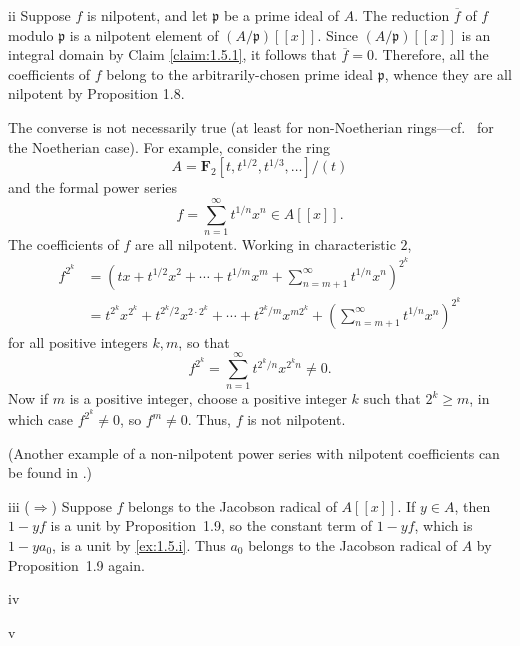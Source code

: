 \begin{partsolution}{1}{5}{ii}
Suppose \(f\) is nilpotent, and let \(\mathfrak p\) be a prime ideal of \(A\).
The reduction \(\overline f\) of \(f\) modulo \(\mathfrak p\) is a nilpotent element of \((A/\mathfrak p)[[x]]\).
Since \((A/\mathfrak p)[[x]]\) is an integral domain by Claim \ref{claim:1.5.1}, it follows that \(\overline f = 0\).
Therefore, all the coefficients of \(f\) belong to the arbitrarily-chosen prime ideal \(\mathfrak p\), whence they are all nilpotent by Proposition 1.8.

The converse is not necessarily true (at least for non-Noetherian rings---cf.~ for the Noetherian case).
For example, consider the ring
\begin{equation*}
A = \mathbf{F}_2[t, t^{1/2}, t^{1/3}, \ldots]/(t)
\end{equation*}
and the formal power series
\begin{equation*}
f = \sum_{n=1}^\infty t^{1/n} x^n \in A[[x]].
\end{equation*}
The coefficients of \(f\) are all nilpotent.
Working in characteristic \(2\),
\begin{align*}
f^{2^k}
&= \left(t x + t^{1/2} x^2 + \cdots + t^{1/m} x^m + \sum_{n = m + 1}^\infty t^{1/n} x^n\right)^{2^k}
\\&= t^{2^k} x^{2^k} + t^{2^k / 2} x^{2\cdot2^k} + \cdots + t^{2^k / m} x^{m 2^k} + \left(\sum_{n = m+1}^\infty t^{1/n} x^n\right)^{2^k}
\end{align*}
for all positive integers \(k, m\), so that
\begin{equation*}
f^{2^k}
= \sum_{n=1}^\infty t^{2^k/n} x^{2^k n} \neq 0.
\end{equation*}
Now if \(m\) is a positive integer, choose a positive integer \(k\) such that \(2^k \geq m\), in which case \(f^{2^k} \neq 0\), so \(f^m \neq 0\).
Thus, \(f\) is not nilpotent.

(Another example of a non-nilpotent power series with nilpotent coefficients can be found in \cite[Example 2]{FieldsZeroDivisors}.)
\end{partsolution}

\begin{partsolution}{1}{5}{iii}
(\(\Rightarrow\))
Suppose \(f\) belongs to the Jacobson radical of \(A[[x]]\).
If \(y \in A\), then \(1 - y f\) is a unit by Proposition~1.9, so the constant term of \(1 - y f\), which is \(1 - y a_0\), is a unit by \ref{ex:1.5.i}.
Thus \(a_0\) belongs to the Jacobson radical of \(A\) by Proposition~1.9 again.

\end{partsolution}

\begin{partsolution}{1}{5}{iv}

\end{partsolution}

\begin{partsolution}{1}{5}{v}

\end{partsolution}